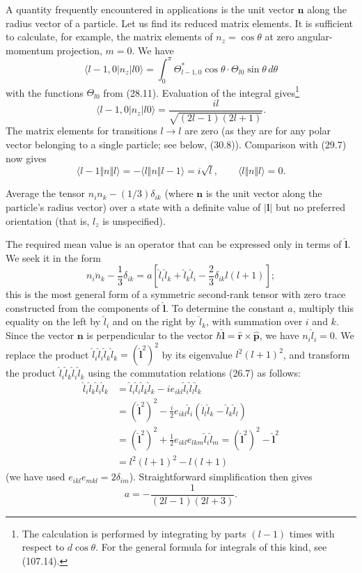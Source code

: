 A quantity frequently encountered in applications is the unit vector
$\mathbf n$ along the radius vector of a particle. Let us find its reduced
matrix elements. It is sufficient to calculate, for example, the matrix
elements of $n_z=\cos\theta$ at zero angular-momentum projection, $m=0$. We
have
\[
 \langle l-1,0|n_z|l0\rangle
 =\int_0^\pi\Theta_{l-1,0}^*\cos\theta\cdot
 \Theta_{l0}\sin\theta\,d\theta
\]
with the functions $\Theta_{l0}$ from (28.11). Evaluation of the integral
gives\footnote{The calculation is performed by integrating by parts
$(l-1)$ times with respect to $d\cos\theta$. For the general formula for
integrals of this kind, see (107.14).}
\[
 \langle l-1,0|n_z|l0\rangle
 =\frac{il}{\sqrt{(2l-1)(2l+1)}}.
\]
The matrix elements for transitions $l\to l$ are zero (as they are for any
polar vector belonging to a single particle; see below, (30.8)). Comparison
with (29.7) now gives
\begin{equation}
 \langle l-1\Vert n\Vert l\rangle
 =-\langle l\Vert n\Vert l-1\rangle=i\sqrt l,
 \qquad \langle l\Vert n\Vert l\rangle=0.
 \tag{29.14}
\end{equation}
\ProblemHeading

Average the tensor $n_in_k-(1/3)\delta_{ik}$ (where $\mathbf n$ is the unit
vector along the particle's radius vector) over a state with a definite value
of $|\mathbf l|$ but no preferred orientation (that is, $l_z$ is
unspecified).

\SolutionHeading The required mean value is an operator that can be expressed
only in terms of $\hat{\mathbf l}$. We seek it in the form
\[
 \overline{n_in_k}-\frac13\delta_{ik}
 =a\left[\hat l_i\hat l_k+\hat l_k\hat l_i
 -\frac23\delta_{ik}l(l+1)\right];
\]
this is the most general form of a symmetric second-rank tensor with zero
trace constructed from the components of $\hat{\mathbf l}$. To determine the
constant $a$, multiply this equality on the left by $\hat l_i$ and on the
right by $\hat l_k$, with summation over $i$ and $k$. Since the vector
$\mathbf n$ is perpendicular to the vector
$\hbar\hat{\mathbf l}=\hat{\mathbf r}\times\hat{\mathbf p}$, we have
$n_i\hat l_i=0$. We replace the product
$\hat l_i\hat l_i\hat l_k\hat l_k=(\hat{\mathbf l}^2)^2$ by its eigenvalue
$l^2(l+1)^2$, and transform the product
$\hat l_i\hat l_k\hat l_i\hat l_k$ using the commutation relations (26.7) as
follows:
\begin{align*}
 \hat l_i\hat l_k\hat l_i\hat l_k
 &=\hat l_i\hat l_i\hat l_k\hat l_k
 -ie_{ikl}\hat l_i\hat l_l\hat l_k\\
 &=(\hat{\mathbf l}^2)^2
 -\frac i2e_{ikl}\hat l_i(\hat l_l\hat l_k-\hat l_k\hat l_l)\\
 &=(\hat{\mathbf l}^2)^2
 +\frac12e_{ikl}e_{lkm}\hat l_i\hat l_m
 =(\hat{\mathbf l}^2)^2-\hat{\mathbf l}^2\\
 &=l^2(l+1)^2-l(l+1)
\end{align*}
(we have used $e_{ikl}e_{mkl}=2\delta_{im}$). Straightforward simplification
then gives
\[
  a=-\frac1{(2l-1)(2l+3)}.
\]
